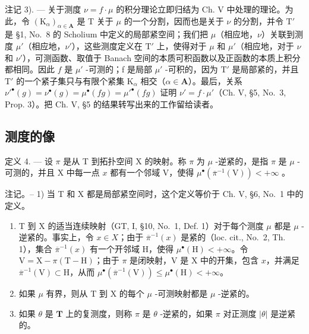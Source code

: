 注记 3). --- 关于测度 \(\nu = f \cdot \mu\) 的积分理论立即归结为 Ch. V 中处理的理论。为此，令 \((\mathrm{K}_{\alpha})_{\alpha \in \mathbf{A}}\) 是 T 关于 \(\mu\) 的一个分割，因而也是关于 \(\nu\) 的分割，并令 \(\mathrm{T}'\) 是 §1, No.~8 的 Scholium 中定义的局部紧空间；我们把 \(\mu\)（相应地，\(\nu\)）关联到测度 \(\mu'\)（相应地，\(\nu'\)），这些测度定义在 \(\mathrm{T}'\) 上，使得对于 \(\mu\) 和 \(\mu'\)（相应地，对于 \(\nu\) 和 \(\nu'\)），可测函数、取值于 Banach 空间的本质可积函数以及正函数的本质上积分都相同。因此 \(f\) 是 \(\mu'\) -可测的；f 是局部 \(\mu'\) -可积的，因为 \(\mathrm{T}'\) 是局部紧的，并且 \(\mathrm{T}'\) 的一个紧子集只与有限个紧集 \(\mathrm{K}_{\alpha}\) 相交（\(\alpha \in \mathbf{A}\)）。最后，关系 \(\nu'^{\bullet}(g) = \nu^{\bullet}(g) = \mu^{\bullet}(fg) = \mu'^{\bullet}(fg)\) 证明 \(\nu' = f \cdot \mu'\)（Ch. V, §5, No.~3, Prop. 3）。把 Ch. V, §5 的结果转写出来的工作留给读者。

\subsection{测度的像}

定义 4. --- 设 \(\pi\) 是从 T 到拓扑空间 X 的映射。称 \(\pi\) 为 \(\mu\) -逆紧的，是指 \(\pi\) 是 \(\mu\) -可测的，并且 X 中每一点 \(x\) 都有一个邻域 V，使得 \(\mu^{\bullet}\left(\overline{\pi}^{-1}(\mathrm{V})\right) < +\infty\) 。

注记。-- 1) 当 T 和 X 都是局部紧空间时，这个定义等价于 Ch. V, §6, No.~1 中的定义。

\begin{enumerate}
\def\labelenumi{\arabic{enumi})}
\setcounter{enumi}{1}
\item
  T 到 X 的适当连续映射（GT, I, §10, No.~1, Def. 1）对于每个测度 \(\mu\) 都是 \(\mu\) -逆紧的。事实上，令 \(x \in X\)；由于 \(\overline{\pi}^{-1}(x)\) 是紧的（loc. cit., No.~2, Th. 1），集合 \(\overline{\pi}^{-1}(x)\) 有一个开邻域 H，使得 \(\mu^{\bullet}(\mathrm{H}) < +\infty\)。令 \(\mathrm{V} = \mathrm{X} - \pi(\mathrm{T} - \mathrm{H})\)；由于 \(\pi\) 是闭映射，V 是 X 中的开集，包含 \(x\)，并满足 \(\overline{\pi}^{-1}(\mathrm{V}) \subset \mathrm{H}\)，从而 \(\mu^{\bullet}(\overline{\pi}^{-1}(\mathrm{V})) \leqslant \mu^{\bullet}(\mathrm{H}) < +\infty\)。
\item
  如果 \(\mu\) 有界，则从 T 到 X 的每个 \(\mu\) -可测映射都是 \(\mu\) -逆紧的。
\item
  如果 \(\theta\) 是 \(\mathbf{T}\) 上的复测度，则称 \(\pi\) 是 \(\theta\) -逆紧的，如果 \(\pi\) 对正测度 \(|\theta|\) 是逆紧的。
\end{enumerate}

